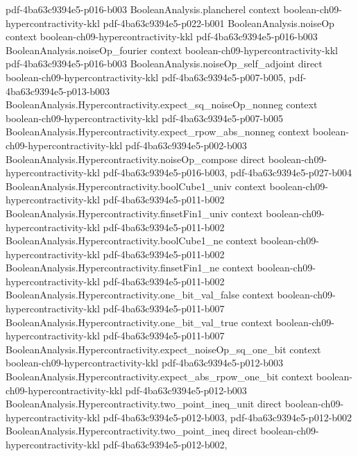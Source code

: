 \begin{theorem}
  {pdf-4ba63c9394e5-p016-b003}
\proofstep
  {BooleanAnalysis.plancherel}
  {context}
  {boolean-ch09-hypercontractivity-kkl}
  {pdf-4ba63c9394e5-p022-b001}
\proofstep
  {BooleanAnalysis.noiseOp}
  {context}
  {boolean-ch09-hypercontractivity-kkl}
  {pdf-4ba63c9394e5-p016-b003}
\proofstep
  {BooleanAnalysis.noiseOp_fourier}
  {context}
  {boolean-ch09-hypercontractivity-kkl}
  {pdf-4ba63c9394e5-p016-b003}
\proofstep
  {BooleanAnalysis.noiseOp_self_adjoint}
  {direct}
  {boolean-ch09-hypercontractivity-kkl}
  {pdf-4ba63c9394e5-p007-b005,
    pdf-4ba63c9394e5-p013-b003}
\proofstep
  {BooleanAnalysis.Hypercontractivity.expect_sq_noiseOp_nonneg}
  {context}
  {boolean-ch09-hypercontractivity-kkl}
  {pdf-4ba63c9394e5-p007-b005}
\proofstep
  {BooleanAnalysis.Hypercontractivity.expect_rpow_abs_nonneg}
  {context}
  {boolean-ch09-hypercontractivity-kkl}
  {pdf-4ba63c9394e5-p002-b003}
\proofstep
  {BooleanAnalysis.Hypercontractivity.noiseOp_compose}
  {direct}
  {boolean-ch09-hypercontractivity-kkl}
  {pdf-4ba63c9394e5-p016-b003,
    pdf-4ba63c9394e5-p027-b004}
\proofstep
  {BooleanAnalysis.Hypercontractivity.boolCube1_univ}
  {context}
  {boolean-ch09-hypercontractivity-kkl}
  {pdf-4ba63c9394e5-p011-b002}
\proofstep
  {BooleanAnalysis.Hypercontractivity.finsetFin1_univ}
  {context}
  {boolean-ch09-hypercontractivity-kkl}
  {pdf-4ba63c9394e5-p011-b002}
\proofstep
  {BooleanAnalysis.Hypercontractivity.boolCube1_ne}
  {context}
  {boolean-ch09-hypercontractivity-kkl}
  {pdf-4ba63c9394e5-p011-b002}
\proofstep
  {BooleanAnalysis.Hypercontractivity.finsetFin1_ne}
  {context}
  {boolean-ch09-hypercontractivity-kkl}
  {pdf-4ba63c9394e5-p011-b002}
\proofstep
  {BooleanAnalysis.Hypercontractivity.one_bit_val_false}
  {context}
  {boolean-ch09-hypercontractivity-kkl}
  {pdf-4ba63c9394e5-p011-b007}
\proofstep
  {BooleanAnalysis.Hypercontractivity.one_bit_val_true}
  {context}
  {boolean-ch09-hypercontractivity-kkl}
  {pdf-4ba63c9394e5-p011-b007}
\proofstep
  {BooleanAnalysis.Hypercontractivity.expect_noiseOp_sq_one_bit}
  {context}
  {boolean-ch09-hypercontractivity-kkl}
  {pdf-4ba63c9394e5-p012-b003}
\proofstep
  {BooleanAnalysis.Hypercontractivity.expect_abs_rpow_one_bit}
  {context}
  {boolean-ch09-hypercontractivity-kkl}
  {pdf-4ba63c9394e5-p012-b003}
\proofstep
  {BooleanAnalysis.Hypercontractivity.two_point_ineq_unit}
  {direct}
  {boolean-ch09-hypercontractivity-kkl}
  {pdf-4ba63c9394e5-p012-b003,
    pdf-4ba63c9394e5-p012-b002}
\proofstep
  {BooleanAnalysis.Hypercontractivity.two_point_ineq}
  {direct}
  {boolean-ch09-hypercontractivity-kkl}
  {pdf-4ba63c9394e5-p012-b002,
}
\end{theorem}

